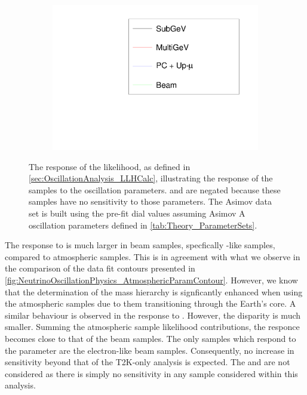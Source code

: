 \begin{figure}[h]
\begin{subfigure}[t]{0.5\textwidth}
    \includegraphics[width=\textwidth, trim={0mm 0mm 0mm 0mm}, clip,page=3]{Figures/OA/LLHScans_Osc.pdf}
  \end{subfigure}
  \caption{The response of the likelihood, as defined in \autoref{sec:OscillationAnalysis_LLHCalc}, illustrating the response of the samples to the oscillation parameters. \delmsqsol and \sinsqsol are negated because these samples have no sensitivity to those parameters. The Asimov data set is built using the pre-fit dial values assuming Asimov A oscillation parameters defined in \autoref{tab:Theory_ParameterSets}. }
  \label{fig:OscillationAnalysis_LLHScanOscPars}
\end{figure}

The response to \delmsqatm is much larger in beam samples, specfically \quickmath{\mu}-like samples, compared to atmospheric samples. This is in agreement with what we observe in the comparison of the data fit contours presented in \autoref{fig:NeutrinoOscillationPhysics_AtmosphericParamContour}. However, we know that the determination of the mass hierarchy is signficantly enhanced when using the atmospheric samples due to them transitioning through the Earth's core. A similar behaviour is observed in the response to \sinsqatm. However, the disparity is much smaller. Summing the atmospheric sample likelihood contributions, the responce becomes close to that of the beam samples. The only samples which respond to the \sinsqreac parameter are the electron-like beam samples. Consequently, no increase in sensitivity beyond that of the T2K-only analysis is expected. The \delmsqsol and \sinsqsol are not considered as there is simply no sensitivity in any sample considered within this analysis.

